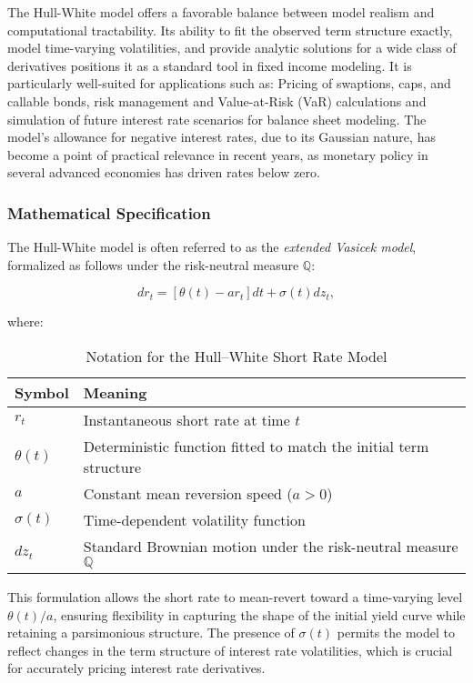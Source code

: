 The Hull-White model offers a favorable balance between model realism and computational tractability. Its ability to fit the observed term structure exactly, model time-varying volatilities, and provide analytic solutions for a wide class of derivatives positions it as a standard tool in fixed income modeling. It is particularly well-suited for applications such as: Pricing of swaptions, caps, and callable bonds, risk management and Value-at-Risk (VaR) calculations and simulation of future interest rate scenarios for balance sheet modeling. The model’s allowance for negative interest rates, due to its Gaussian nature, has become a point of practical relevance in recent years, as monetary policy in several advanced economies has driven rates below zero.

\subsubsection{Mathematical Specification}
The Hull-White model is often referred to as the \textit{extended Vasicek model}, formalized as follows under the risk-neutral measure \( \mathbb{Q} \):

\begin{equation}
dr_t = \left[ \theta(t) - a r_t \right] dt + \sigma(t) dz_t,
\end{equation}

where:
\begin{table}[H]
\centering
\caption{Notation for the Hull--White Short Rate Model}
\begin{tabular}{ll}
\toprule
\textbf{Symbol} & \textbf{Meaning} \\
\midrule
$r_t$ & Instantaneous short rate at time $t$ \\
$\theta(t)$ & Deterministic function fitted to match the initial term structure \\
$a$ & Constant mean reversion speed ($a > 0$) \\
$\sigma(t)$ & Time-dependent volatility function \\
$dz_t$ & Standard Brownian motion under the risk-neutral measure $\mathbb{Q}$ \\
\bottomrule
\end{tabular}
\end{table}

This formulation allows the short rate to mean-revert toward a time-varying level \( \theta(t)/a \), ensuring flexibility in capturing the shape of the initial yield curve while retaining a parsimonious structure. The presence of \( \sigma(t) \) permits the model to reflect changes in the term structure of interest rate volatilities, which is crucial for accurately pricing interest rate derivatives.

